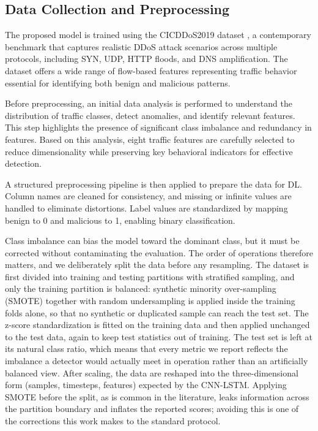 \documentclass[ASNA,twocolumn]{USG} %
\begin{document}
\subsection{Data Collection and Preprocessing}
The proposed model is trained using the CICDDoS2019 dataset \cite{cicddos2019dataset}, a contemporary benchmark that captures realistic DDoS attack scenarios across multiple protocols, including SYN, UDP, HTTP floods, and DNS amplification. The dataset offers a wide range of flow-based features representing traffic behavior essential for identifying both benign and malicious patterns.

Before preprocessing, an initial data analysis is performed to understand the distribution of traffic classes, detect anomalies, and identify relevant features. This step highlights the presence of significant class imbalance and redundancy in features. Based on this analysis, eight traffic features are carefully selected to reduce dimensionality while preserving key behavioral indicators for effective detection.

A structured preprocessing pipeline is then applied to prepare the data for DL. Column names are cleaned for consistency, and missing or infinite values are handled to eliminate distortions. Label values are standardized by mapping benign to 0 and malicious to 1, enabling binary classification.

Class imbalance can bias the model toward the dominant class, but it must be corrected without contaminating the evaluation. The order of operations therefore matters, and we deliberately split the data before any resampling. The dataset is first divided into training and testing partitions with stratified sampling, and only the training partition is balanced: synthetic minority over-sampling (SMOTE) together with random undersampling is applied inside the training folds alone, so that no synthetic or duplicated sample can reach the test set. The z-score standardization is fitted on the training data and then applied unchanged to the test data, again to keep test statistics out of training. The test set is left at its natural class ratio, which means that every metric we report reflects the imbalance a detector would actually meet in operation rather than an artificially balanced view. After scaling, the data are reshaped into the three-dimensional form (samples, timesteps, features) expected by the CNN-LSTM. Applying SMOTE before the split, as is common in the literature, leaks information across the partition boundary and inflates the reported scores; avoiding this is one of the corrections this work makes to the standard protocol.
\end{document}
